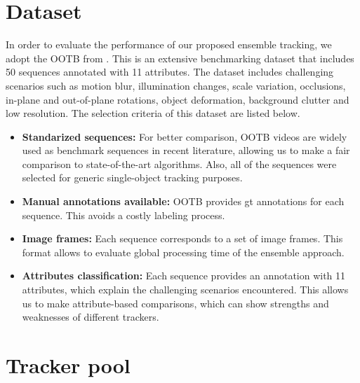 \section{Dataset}
In order to evaluate the performance of our proposed ensemble tracking,
we adopt the OOTB from \cite{Wu2013B}.
This is an extensive benchmarking dataset that includes 50 sequences
annotated with 11 attributes.
The dataset includes challenging scenarios such as motion blur,
illumination changes, scale variation, occlusions,
in-plane and out-of-plane rotations, object deformation,
background clutter and low resolution. The selection criteria of this dataset
are listed below. 
\begin{itemize}
\item \textbf{Standarized sequences: }For better comparison, OOTB videos are
widely used as benchmark sequences in recent literature, allowing us to make a
fair comparison to state-of-the-art algorithms. Also, all of the sequences were
selected for generic single-object tracking purposes.
\item \textbf{Manual annotations available: }OOTB provides \gls{gt} annotations for
each sequence. This avoids a costly labeling process.
\item \textbf{Image frames: } Each sequence corresponds to a set of image frames. This
format allows to evaluate global processing time of the ensemble approach.
\item \textbf{Attributes classification: } Each sequence provides an annotation with 11
attributes, which explain the challenging scenarios encountered. This
allows us to make attribute-based comparisons, which can show strengths and weaknesses of different trackers.

\end{itemize}

\section{Tracker pool}

